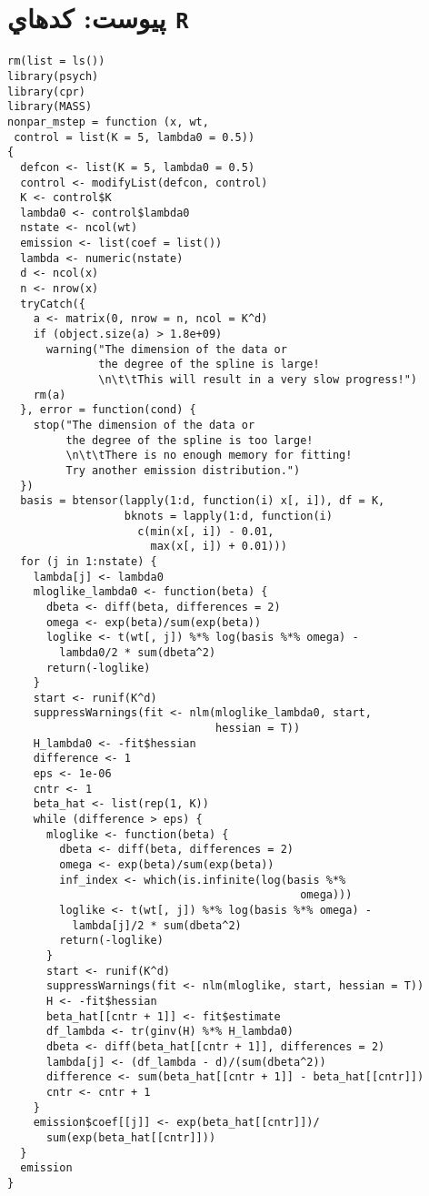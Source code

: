 \linespread{1}
\chapter*{پيوست: كدهاي \texttt{R}}
\begin{latin}
\begin{lstlisting}[title={\large Nonparametric M-step}] 
rm(list = ls())
library(psych)
library(cpr)
library(MASS)
nonpar_mstep = function (x, wt,
 control = list(K = 5, lambda0 = 0.5)) 
{
  defcon <- list(K = 5, lambda0 = 0.5)
  control <- modifyList(defcon, control)
  K <- control$K
  lambda0 <- control$lambda0
  nstate <- ncol(wt)
  emission <- list(coef = list())
  lambda <- numeric(nstate)
  d <- ncol(x)
  n <- nrow(x)
  tryCatch({
    a <- matrix(0, nrow = n, ncol = K^d)
    if (object.size(a) > 1.8e+09) 
      warning("The dimension of the data or 
              the degree of the spline is large!
              \n\t\tThis will result in a very slow progress!")
    rm(a)
  }, error = function(cond) {
    stop("The dimension of the data or
         the degree of the spline is too large!
         \n\t\tThere is no enough memory for fitting!
         Try another emission distribution.")
  })
  basis = btensor(lapply(1:d, function(i) x[, i]), df = K, 
                  bknots = lapply(1:d, function(i)
                    c(min(x[, i]) - 0.01,
                      max(x[, i]) + 0.01)))
  for (j in 1:nstate) {
    lambda[j] <- lambda0
    mloglike_lambda0 <- function(beta) {
      dbeta <- diff(beta, differences = 2)
      omega <- exp(beta)/sum(exp(beta))
      loglike <- t(wt[, j]) %*% log(basis %*% omega) - 
        lambda0/2 * sum(dbeta^2)
      return(-loglike)
    }
    start <- runif(K^d)
    suppressWarnings(fit <- nlm(mloglike_lambda0, start, 
                                hessian = T))
    H_lambda0 <- -fit$hessian
    difference <- 1
    eps <- 1e-06
    cntr <- 1
    beta_hat <- list(rep(1, K))
    while (difference > eps) {
      mloglike <- function(beta) {
        dbeta <- diff(beta, differences = 2)
        omega <- exp(beta)/sum(exp(beta))
        inf_index <- which(is.infinite(log(basis %*% 
                                             omega)))
        loglike <- t(wt[, j]) %*% log(basis %*% omega) - 
          lambda[j]/2 * sum(dbeta^2)
        return(-loglike)
      }
      start <- runif(K^d)
      suppressWarnings(fit <- nlm(mloglike, start, hessian = T))
      H <- -fit$hessian
      beta_hat[[cntr + 1]] <- fit$estimate
      df_lambda <- tr(ginv(H) %*% H_lambda0)
      dbeta <- diff(beta_hat[[cntr + 1]], differences = 2)
      lambda[j] <- (df_lambda - d)/(sum(dbeta^2))
      difference <- sum(beta_hat[[cntr + 1]] - beta_hat[[cntr]])
      cntr <- cntr + 1
    }
    emission$coef[[j]] <- exp(beta_hat[[cntr]])/
      sum(exp(beta_hat[[cntr]]))
  }
  emission
}
\end{lstlisting}
\end{latin}
